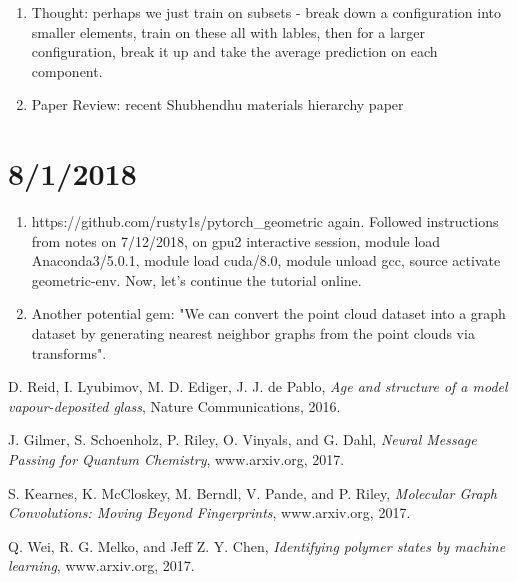 \documentclass[12pt,reqno]{amsart}
\numberwithin{equation}{section}
\begin{document}
\begin{enumerate}
\item Thought: perhaps we just train on subsets - break down a configuration into smaller elements, train on these all with lables, then for a larger configuration, break it up and take the average prediction on each component.  

\item Paper Review: recent Shubhendhu materials hierarchy paper
\end{enumerate}

\section{8/1/2018}
\begin{enumerate}
\item https://github.com/rusty1s/pytorch\_geometric again.  Followed instructions from notes on 7/12/2018, on gpu2 interactive session, module load Anaconda3/5.0.1, module load cuda/8.0, module unload gcc, source activate geometric-env.  Now, let's continue the tutorial online.  
\item Another potential gem: "We can convert the point cloud dataset into a graph dataset by generating nearest neighbor graphs from the point clouds via transforms".  
\end{enumerate}


\begin{thebibliography}{Al-F11}
D. Reid, I. Lyubimov, M. D. Ediger, J. J. de Pablo, \textit{Age and structure of a model vapour-deposited glass}, Nature Communications, 2016. 

 J. Gilmer, S. Schoenholz, P. Riley, O. Vinyals, and G. Dahl, \textit{Neural Message Passing for Quantum Chemistry}, www.arxiv.org, 2017.  

S. Kearnes, K. McCloskey, M. Berndl, V. Pande, and P. Riley, \textit{Molecular Graph Convolutions: Moving Beyond Fingerprints}, www.arxiv.org, 2017.

Q. Wei, R. G. Melko, and Jeff Z. Y. Chen, \textit{Identifying polymer states by machine learning}, www.arxiv.org, 2017.  

\end{thebibliography}
\end{document}
